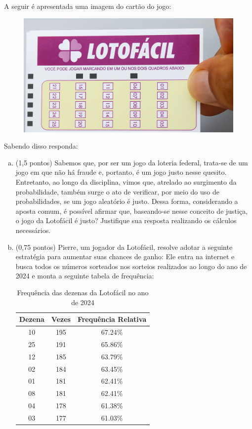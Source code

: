 \documentclass[12pt]{article}
\begin{document}
A seguir é apresentada uma imagem do cartão do jogo:

\begin{figure}[H]
    \centering
    \includegraphics[width=0.5\linewidth]{figures/lotofacil.png}
\end{figure}

Sabendo disso responda:

\begin{enumerate}[a)]
    \item (1,5 pontos) Sabemos que, por ser um jogo da loteria federal, trata-se de um jogo em que não há fraude e, portanto, é um jogo justo nesse quesito. Entretanto, ao longo
    da disciplina, vimos que, atrelado ao surgimento da probabilidade, também surge o ato de verificar, por meio do uso de probabilidades, se um jogo aleatório 
    é justo. Dessa forma, considerando a aposta comum, é possível afirmar que, baseando-se nesse conceito de justiça, o jogo da Lotofácil é justo? Justifique sua resposta realizando os cálculos 
    necessários. 
    \item (0,75 pontos) Pierre, um jogador da Lotofácil, resolve adotar a seguinte estratégia para aumentar suas chances de ganho: Ele entra na internet e busca todos os números sorteados
    nos sorteios realizados ao longo do ano de 2024 e monta a seguinte tabela de frequência:
\begin{table}[H]
\centering
\caption{Frequência das dezenas da Lotofácil no ano de 2024}
\begin{tabular}{|c|c|c|}
\hline
\textbf{Dezena} & \textbf{Vezes} & \textbf{Frequência Relativa} \\ \hline
10 & 195 & 67.24\% \\ \hline
25 & 191 & 65.86\% \\ \hline
12 & 185 & 63.79\% \\ \hline
02 & 184 & 63.45\% \\ \hline
01 & 181 & 62.41\% \\ \hline
08 & 181 & 62.41\% \\ \hline
04 & 178 & 61.38\% \\ \hline
03 & 177 & 61.03\% \\ \hline

\end{tabular}
\end{table}
\end{enumerate}
\end{document}
